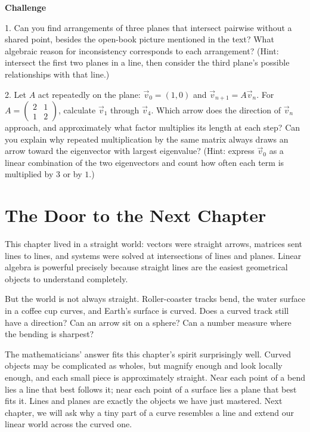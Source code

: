 \textbf{Challenge}

1. Can you find arrangements of three planes that intersect pairwise without a shared point, besides the open-book picture mentioned in the text? What algebraic reason for inconsistency corresponds to each arrangement? (Hint: intersect the first two planes in a line, then consider the third plane's possible relationships with that line.)

2. Let $A$ act repeatedly on the plane: $\vec{v}_0=(1,0)$ and $\vec{v}_{n+1}=A\vec{v}_n$. For $A=\begin{pmatrix}2&1\\1&2\end{pmatrix}$, calculate $\vec{v}_1$ through $\vec{v}_4$. Which arrow does the direction of $\vec{v}_n$ approach, and approximately what factor multiplies its length at each step? Can you explain why repeated multiplication by the same matrix always draws an arrow toward the eigenvector with largest eigenvalue? (Hint: express $\vec{v}_0$ as a linear combination of the two eigenvectors and count how often each term is multiplied by $3$ or by $1$.)

\section*{The Door to the Next Chapter}

This chapter lived in a straight world: vectors were straight arrows, matrices sent lines to lines, and systems were solved at intersections of lines and planes. Linear algebra is powerful precisely because straight lines are the easiest geometrical objects to understand completely.

But the world is not always straight. Roller-coaster tracks bend, the water surface in a coffee cup curves, and Earth's surface is curved. Does a curved track still have a direction? Can an arrow sit on a sphere? Can a number measure where the bending is sharpest?

The mathematicians' answer fits this chapter's spirit surprisingly well. Curved objects may be complicated as wholes, but magnify enough and look locally enough, and each small piece is approximately straight. Near each point of a bend lies a line that best follows it; near each point of a surface lies a plane that best fits it. Lines and planes are exactly the objects we have just mastered. Next chapter, we will ask why a tiny part of a curve resembles a line and extend our linear world across the curved one.

